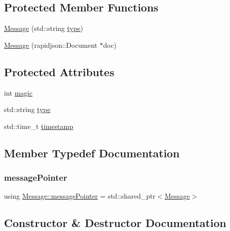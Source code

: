 \subsection*{Protected Member Functions}
\begin{DoxyCompactItemize}
\item 
\mbox{\hyperlink{classMessage_aa222cbc5bf7865d5464a841740f45c11}{Message}} (std\+::string \mbox{\hyperlink{classMessage_ae9dead264183a4243c120026e6259b6f}{type}})
\item 
\mbox{\hyperlink{classMessage_a92ef92d05b8d6ca2647aff6eeb61df70}{Message}} (rapidjson\+::\+Document $\ast$doc)
\end{DoxyCompactItemize}
\subsection*{Protected Attributes}
\begin{DoxyCompactItemize}
\item 
int \mbox{\hyperlink{classMessage_a5bb4366b0a888886fec19ca2b2903d00}{magic}}
\item 
std\+::string \mbox{\hyperlink{classMessage_ae9dead264183a4243c120026e6259b6f}{type}}
\item 
std\+::time\+\_\+t \mbox{\hyperlink{classMessage_a78b882ca696ae5b4387b829132ff21ab}{timestamp}}
\end{DoxyCompactItemize}


\subsection{Member Typedef Documentation}
\mbox{\label{classMessage_a3f7f2aa1058cb5f0b74a1fbb7fcd00e5}} 
\subsubsection{\texorpdfstring{message\+Pointer}{messagePointer}}
{\footnotesize\ttfamily using \mbox{\hyperlink{classMessage_a3f7f2aa1058cb5f0b74a1fbb7fcd00e5}{Message\+::message\+Pointer}} =  std\+::shared\+\_\+ptr$<$\mbox{\hyperlink{classMessage}{Message}}$>$}



\subsection{Constructor \& Destructor Documentation}
\mbox{\label{classMessage_aa222cbc5bf7865d5464a841740f45c11}} 
